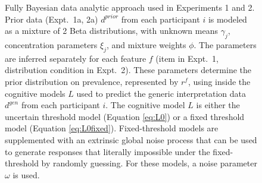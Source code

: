 \documentclass[floatsintext,doc]{apa6}
\begin{document}
\begin{figure}[ht]
  \caption{Fully Bayesian data analytic approach used in Experiments 1 and 2. Prior data (Expt.~1a, 2a) $d^{prior}$ from each participant $i$ is modeled as a mixture of 2 Beta distributions, with unknown means $\gamma_j$, concentration parameters $\xi_j$, and mixture weights $\phi$. The parameters are inferred separately for each feature $f$ (item in Expt.~1, distribution condition in Expt.~2). These parameters determine the prior distribution on prevalence, represented by $r^f$, using inside the cognitive models $L$ used to predict the generic interpretation data $d^{gen}$ from each participant $i$. The cognitive model $L$ is either the uncertain threshold model (Equation \ref{eq:L0}) or a fixed threshold model (Equation \ref{eq:L0fixed}). Fixed-threshold models are supplemented with an extrinsic global noise process that can be used to generate responses that literally impossible under the fixed-threshold by randomly guessing. For these models, a noise parameter $\omega$ is used.}
  \label{fig:bayesnet}
\end{figure}


\end{document}
